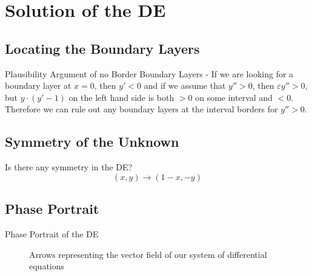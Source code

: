\section{Solution of the DE}%
\label{sec:solution_of_the_de}


\subsection{Locating the Boundary Layers}%
\label{sub:locating_the_boundary_layers}

\begin{frame}{Plausibility Argument of no Border Boundary Layers - \cite{holmes2012}}
    If we are looking for a boundary layer at \(x = 0\), then \(y' < 0\) and if we assume that \(y'' > 0\), then
    \(\varepsilon y'' > 0\), but \(y\cdot (y' - 1)\) on the left hand side is both \(>0\) on some interval and \(<0\).
    Therefore we can rule out any boundary layers at the interval borders for \(y'' > 0\).
\end{frame}


\subsection{Symmetry of the Unknown}%
\label{sub:symmetry_of_the_unknown}
\begin{frame}
  Is there any symmetry in the DE? \\ \pause
  \[
      (x,y) \to (1-x, -y)
  \] 
\end{frame}

\subsection{Phase Portrait}%
\label{sub:phase_portrait}

\begin{frame}{Phase Portrait of the DE}
    \pause
\end{frame}

\begin{frame}
  \begin{figure}
    \centering
    \caption{Arrows representing the vector field of our system of differential equations}
  \end{figure}
\end{frame}

